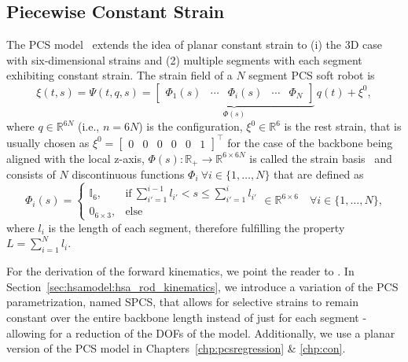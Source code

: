 \subsection{Piecewise Constant Strain}
The \gls{PCS} model~\citep{renda2016discrete, renda2018discrete} extends the idea of planar constant strain to (i) the 3D case with six-dimensional strains and (2) multiple segments with each segment exhibiting constant strain. 
The strain field of a $N$ segment \gls{PCS} soft robot is
\begin{equation}
    \xi(t,s) = \Psi(t,q,s) = \underbrace{\begin{bmatrix}
        \Phi_1(s) & \cdots & \Phi_i(s) & \cdots & \Phi_N
    \end{bmatrix}}_{\Phi(s)} \, q(t) + \xi^0,
\end{equation}
where $q \in \mathbb{R}^{6N}$ (i.e., $n=6N$) is the configuration,
$\xi^0 \in \mathbb{R}^6$ is the rest strain, that is usually chosen as $\xi^0 = \begin{bmatrix}
    0 & 0 & 0 & 0 & 0 & 1
\end{bmatrix}^\top$ for the case of the backbone being aligned with the local z-axis,
$\Phi(s): \mathbb{R_+} \to \mathbb{R}^{6 \times 6N}$ is called the strain basis~\citep{renda2020geometric, mathew2025reduced} and consists of
$N$ discontinuous functions $\Phi_i \: \forall i \in \{ 1,\dots, N \}$ that are defined as
\begin{equation}
    \Phi_i(s) = \begin{cases}
        \mathbb{I}_{6}, & \text{if} \: \sum_{i'=1}^{i-1} l_{i'} < s \leq \sum_{i'= 1}^{i} l_{i'} \\
        0_{6\times 3}, & \text{else}
    \end{cases} \in \mathbb{R}^{6 \times 6} \quad \forall i \in \{ 1,\dots, N \},
\end{equation}
where $l_i$ is the length of each segment, therefore fulfilling the property $L = \sum_{i=1}^{N} l_i$.

For the derivation of the forward kinematics, we point the reader to \citet{renda2018discrete}. In Section~\ref{sec:hsamodel:hsa_rod_kinematics}, we introduce a variation of the \gls{PCS} parametrization, named \gls{SPCS}, that allows for selective strains to remain constant over the entire backbone length instead of just for each segment - allowing for a reduction of the \glspl{DOF} of the model.
Additionally, we use a planar version of the \gls{PCS} model in Chapters~\ref{chp:pcsregression} \& \ref{chp:con}.


